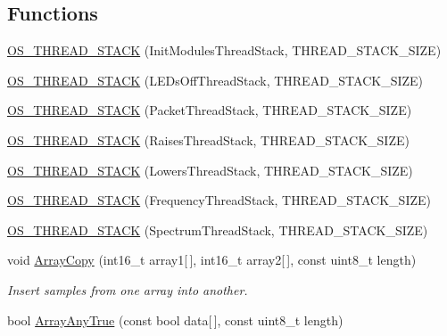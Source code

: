 \subsection*{Functions}
\begin{DoxyCompactItemize}
\item 
\hyperlink{group__main__module_gac2875955d67e96abf6cfa8aaad5e9f75}{O\+S\+\_\+\+T\+H\+R\+E\+A\+D\+\_\+\+S\+T\+A\+C\+K} (Init\+Modules\+Thread\+Stack, T\+H\+R\+E\+A\+D\+\_\+\+S\+T\+A\+C\+K\+\_\+\+S\+I\+Z\+E)
\item 
\hyperlink{group__main__module_ga78e32208fd29f8777453fba66cb23512}{O\+S\+\_\+\+T\+H\+R\+E\+A\+D\+\_\+\+S\+T\+A\+C\+K} (L\+E\+Ds\+Off\+Thread\+Stack, T\+H\+R\+E\+A\+D\+\_\+\+S\+T\+A\+C\+K\+\_\+\+S\+I\+Z\+E)
\item 
\hyperlink{group__main__module_gab4c1c0cd94088cbbb7b7caa74232e2b8}{O\+S\+\_\+\+T\+H\+R\+E\+A\+D\+\_\+\+S\+T\+A\+C\+K} (Packet\+Thread\+Stack, T\+H\+R\+E\+A\+D\+\_\+\+S\+T\+A\+C\+K\+\_\+\+S\+I\+Z\+E)
\item 
\hyperlink{group__main__module_ga05a413cec42e7d893bccc45d54001bb7}{O\+S\+\_\+\+T\+H\+R\+E\+A\+D\+\_\+\+S\+T\+A\+C\+K} (Raises\+Thread\+Stack, T\+H\+R\+E\+A\+D\+\_\+\+S\+T\+A\+C\+K\+\_\+\+S\+I\+Z\+E)
\item 
\hyperlink{group__main__module_ga74d9df5a06cceec1b45c61e69c6d1718}{O\+S\+\_\+\+T\+H\+R\+E\+A\+D\+\_\+\+S\+T\+A\+C\+K} (Lowers\+Thread\+Stack, T\+H\+R\+E\+A\+D\+\_\+\+S\+T\+A\+C\+K\+\_\+\+S\+I\+Z\+E)
\item 
\hyperlink{group__main__module_gaf1afd8f3ce4eedf9ad5254b8750ad1fa}{O\+S\+\_\+\+T\+H\+R\+E\+A\+D\+\_\+\+S\+T\+A\+C\+K} (Frequency\+Thread\+Stack, T\+H\+R\+E\+A\+D\+\_\+\+S\+T\+A\+C\+K\+\_\+\+S\+I\+Z\+E)
\item 
\hyperlink{group__main__module_ga9abdf6124e333220d024a49b5ce39883}{O\+S\+\_\+\+T\+H\+R\+E\+A\+D\+\_\+\+S\+T\+A\+C\+K} (Spectrum\+Thread\+Stack, T\+H\+R\+E\+A\+D\+\_\+\+S\+T\+A\+C\+K\+\_\+\+S\+I\+Z\+E)
\item 
void \hyperlink{group__main__module_gad34224c2b50d9cf295ffb21b305b149f}{Array\+Copy} (int16\+\_\+t array1\mbox{[}$\,$\mbox{]}, int16\+\_\+t array2\mbox{[}$\,$\mbox{]}, const uint8\+\_\+t length)
\begin{DoxyCompactList}\small\item\em Insert samples from one array into another. \end{DoxyCompactList}\item 
bool \hyperlink{group__main__module_gaa069de5ba1209f491602c162f072b664}{Array\+Any\+True} (const bool data\mbox{[}$\,$\mbox{]}, const uint8\+\_\+t length)

\end{DoxyCompactItemize}
